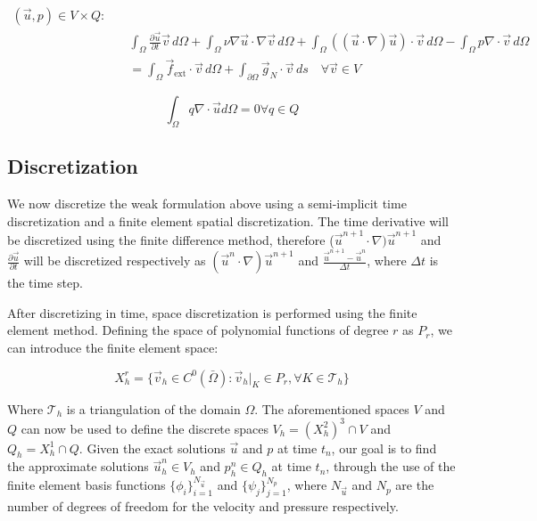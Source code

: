 \begin{equation}
\begin{aligned}
    (\vec{u}, p) \in V \times Q : \quad & \\
    &\int_{\Omega} \frac{\partial \vec{u}}{\partial t} \vec{v} \, d\Omega + \int_{\Omega} \nu \nabla \vec{u} \cdot \nabla \vec{v} \, d\Omega + \int_{\Omega} ((\vec{u} \cdot \nabla) \vec{u}) \cdot \vec{v} \, d\Omega - \int_{\Omega} p \nabla \cdot \vec{v} \, d\Omega \\
    &= \int_{\Omega} \vec{f}_{\text{ext}} \cdot \vec{v} \, d\Omega + \int_{\partial \Omega} \vec{g}_N \cdot \vec{v} \, ds \quad \forall \vec{v} \in V
\end{aligned}
\end{equation}
    
\begin{equation}
    \int_{\Omega} q \nabla \cdot \vec{u} d \Omega = 0 \forall q \in Q
\end{equation}

\subsection{Discretization}
We now discretize the weak formulation above using a semi-implicit time discretization and a finite element spatial discretization. The time derivative will be discretized using the finite difference method, therefore ($\vec{u}^{n+1} \cdot \nabla) \vec{u}^{n+1}$ and $\frac{\partial \vec{u}}{\partial t}$ will be discretized respectively as $(\vec{u}^n \cdot \nabla) \vec{u}^{n+1}$ and $\frac{\vec{u}^{n+1} - \vec{u}^n}{\Delta t}$, where $\Delta t$ is the time step.

After discretizing in time, space discretization is performed using the finite element method. Defining the space of polynomial functions of degree $r$ as $P_r$, we can introduce the finite element space:

\begin{equation}
    X_h^r = \{\vec{v}_h \in C^0(\bar\Omega) : \vec{v}_h|_K \in P_r, \forall K \in \mathcal{T}_h\}
\end{equation}

Where $\mathcal{T}_h$ is a triangulation of the domain $\Omega$. The aforementioned spaces $V$ and $Q$ can now be used to define the discrete spaces $V_h = (X_h^2)^3 \cap V$ and $Q_h = X_h^1 \cap Q$.
Given the exact solutions $\vec{u}$ and $p$ at time $t_n$, our goal is to find the approximate solutions $\vec{u}^n_h \in V_h$ and $p^n_h \in Q_h$ at time $t_n$, through the use of the finite element basis functions $\{\phi_i\}_{i=1}^{N_{\vec{u}}}$ and $\{\psi_j\}_{j=1}^{N_p}$, where $N_{\vec{u}}$ and $N_p$ are the number of degrees of freedom for the velocity and pressure respectively.

